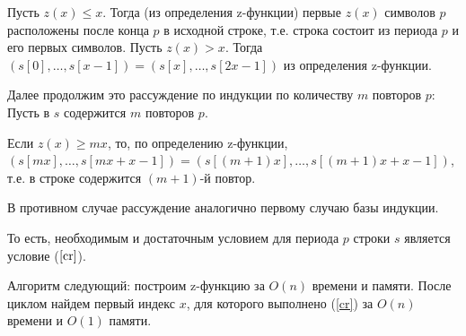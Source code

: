\documentclass{article}
\begin{document}
Пусть $z(x)\leq x$. Тогда (из определения z-функции) первые $z(x)$ символов $p$ расположены после конца $p$ в исходной строке, т.е. строка состоит из периода $p$ и его первых символов.
Пусть $z(x)>x$. Тогда $(s[0],\dots,s[x-1])=(s[x],\dots,s[2x-1])$ из определения z-функции.

Далее продолжим это рассуждение по индукции по количеству $m$ повторов $p$: Пусть в $s$ содержится $m$ повторов $p$.

Если $z(x)\geq mx$, то, по определению z-функции, $(s[mx],\dots,s[mx+x-1])=(s[(m+1)x],\dots,s[(m+1)x+x-1])$, т.е. в строке содержится $(m+1)$-й повтор.

В противном случае рассуждение аналогично первому случаю базы индукции.

То есть, необходимым и достаточным условием для периода $p$ строки $s$ является условие ($\ref{cr}$).

Алгоритм следующий: построим z-функцию за $O(n)$ времени и памяти. После циклом найдем первый индекс $x$, для которого выполнено (\ref{cr}) за $O(n)$ времени и $O(1)$ памяти.
\end{document}
